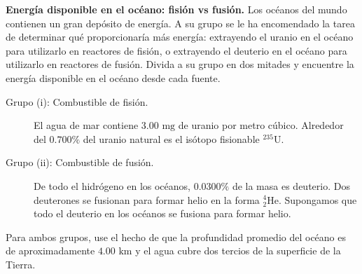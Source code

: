 \item \textbf{Energía disponible en el océano: fisión vs fusión.}
Los océanos del mundo contienen un gran depósito de energía. A su grupo se le ha encomendado la tarea de determinar qué proporcionaría más energía: extrayendo el uranio en el océano para utilizarlo en reactores de fisión, o extrayendo el deuterio en el océano para utilizarlo en reactores de fusión. Divida a su grupo en dos mitades y encuentre la energía disponible en el océano desde cada fuente.
\begin{description}
    \item[Grupo (i): Combustible de fisión.] El agua de mar contiene $3.00\text{ mg}$ de uranio por metro cúbico. Alrededor del $0.700\%$ del uranio natural es el isótopo fisionable $^{235}\text{U}$.
    \item[Grupo (ii): Combustible de fusión.] De todo el hidrógeno en los océanos, $0.0300\%$ de la masa es deuterio. Dos deuterones se fusionan para formar helio en la forma $^{4}_{2}\text{He}$. Supongamos que todo el deuterio en los océanos se fusiona para formar helio.
\end{description}
Para ambos grupos, use el hecho de que la profundidad promedio del océano es de aproximadamente $4.00\text{ km}$ y el agua cubre dos tercios de la superficie de la Tierra.